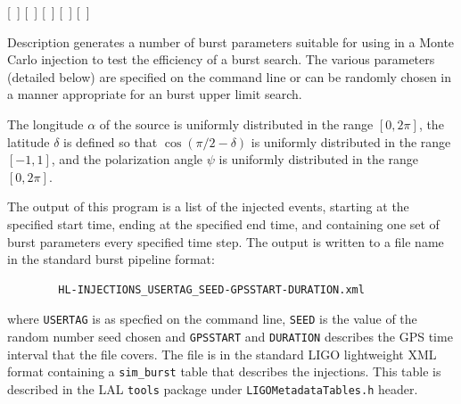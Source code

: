 \begin{entry}
 \newline \hspace*{0.5in}
[~] \newline \hspace*{0.5in}
[~] \newline \hspace*{0.5in}
[~] \newline \hspace*{0.5in}
[~] \newline \hspace*{0.5in}
[~]

\item[Description] 
 generates a number of burst  parameters suitable  for
using in a Monte Carlo injection to test the efficiency of a burst search.
The  various parameters (detailed  below)  are specified on the command
line or can be randomly chosen in a manner appropriate for an burst upper
limit search.

The longitude $\alpha$ of the source is uniformly distributed in the range
$[0,2\pi]$, the latitude $\delta$ is defined so that $\cos(\pi/2 - \delta)$
is uniformly distributed in the range $[-1,1]$,  and the polarization angle
$\psi$  is uniformly distributed in the range $[0,2\pi]$.

The output of this program  is  a  list  of  the  injected events,
starting at  the specified start time, ending at the specified end time,
and containing one set  of burst parameters every specified time step.  The
output is written to a file name in the standard burst pipeline format:
\begin{center}
\begin{verbatim}
        HL-INJECTIONS_USERTAG_SEED-GPSSTART-DURATION.xml
\end{verbatim}
\end{center}
where \verb$USERTAG$ is  as specfied on the command line,
\verb$SEED$ is the  value  of  the random number seed chosen and
\verb$GPSSTART$ and \verb$DURATION$ describes the GPS time interval that
the file covers. The file is in the standard LIGO lightweight XML format
containing a \texttt{sim\_burst} table that describes the injections.  This
table is described in the LAL \texttt{tools} package under
\texttt{LIGOMetadataTables.h} header.  


\end{entry}
